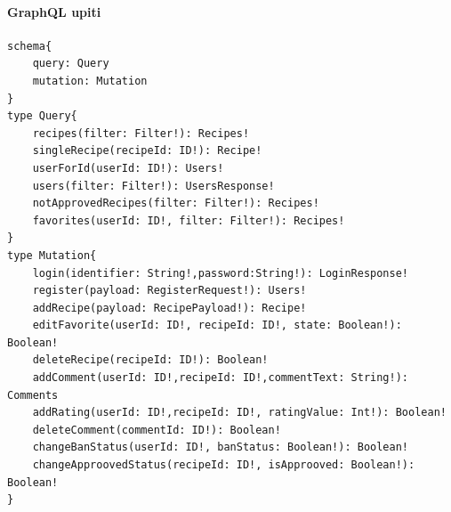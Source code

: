 \documentclass[times, utf8, zavrsni]{fer}
\begin{document}
\paragraph{GraphQL upiti}
\label{graphqlSchema}
\begin{Verbatim}[fontsize=\scriptsize]
schema{
    query: Query
    mutation: Mutation
}
type Query{
    recipes(filter: Filter!): Recipes!
    singleRecipe(recipeId: ID!): Recipe!
    userForId(userId: ID!): Users!
    users(filter: Filter!): UsersResponse!
    notApprovedRecipes(filter: Filter!): Recipes!
    favorites(userId: ID!, filter: Filter!): Recipes!
}
type Mutation{
    login(identifier: String!,password:String!): LoginResponse!
    register(payload: RegisterRequest!): Users!
    addRecipe(payload: RecipePayload!): Recipe!
    editFavorite(userId: ID!, recipeId: ID!, state: Boolean!): Boolean!
    deleteRecipe(recipeId: ID!): Boolean!
    addComment(userId: ID!,recipeId: ID!,commentText: String!): Comments
    addRating(userId: ID!,recipeId: ID!, ratingValue: Int!): Boolean!
    deleteComment(commentId: ID!): Boolean!
    changeBanStatus(userId: ID!, banStatus: Boolean!): Boolean!
    changeApproovedStatus(recipeId: ID!, isApprooved: Boolean!): Boolean!
}
\end{Verbatim}
\end{document}
